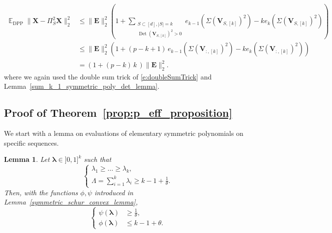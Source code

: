 \documentclass[twoside,11pt]{book}
\newtheorem{lemma}{Lemma}
\numberwithin{theorem}{chapter}
\numberwithin{definition}{chapter}
\numberwithin{proposition}{chapter}
\numberwithin{corollary}{chapter}
\numberwithin{example}{chapter}
\numberwithin{lemma}{chapter}
\numberwithin{assumption}{chapter}
\DeclareMathOperator{\Det}{Det}
\DeclareMathOperator{\DPP}{\mathrm{DPP}}
\DeclareMathOperator{\EX}{\mathbb{E}}
\begin{document}
\begin{align*}
    \EX_{\DPP} \| \bm{X} - \Pi_{S}^{2}\bm{X} \|_{2}^{2} & \leq  \| \bm{E}\|_{2}^{2} \left(1+\sum_{\substack{S \subset [d], |S| = k\\ \Det(\bm{V}_{S,[k]})^{2}>0}} e_{k-1}(\Sigma(\bm{V}_{S,[k]})^{2}) - k e_{k}(\Sigma(\bm{V}_{S,[k]})^{2}) \right)\\
    & \leq \| \bm{E}\|_{2}^{2} \left( 1+ (p-k+1)\,e_{k-1}(\Sigma(\bm{V}_{:,[k]})^{2}) - k e_{k}(\Sigma(\bm{V}_{:,[k]})^{2}) \right)\,\\
    &= (1+(p-k)\,k\,)\| \bm{E}\|_{2}^{2}.
\end{align*}
where we again used the double sum trick of \eqref{e:doubleSumTrick} and Lemma~\ref{sum_k_1_symmetric_poly_det_lemma}.%



\subsection{Proof of Theorem~\ref{prop:p_eff_proposition}}
\label{s:proofOfEffectiveSparsitySetting}
We start with a lemma on evaluations of elementary symmetric polynomials on specific sequences.
\begin{lemma}\label{lemma_k_minus_half}
Let $\bm{\lambda}\in ]0,1]^{k}$ such that
\begin{equation}
	\left\{
	\begin{array}{l}
	    \lambda_{1} \geq \dots \geq \lambda_{k},\\
		\label{eq:lambda_schur_hypo}
   		\Lambda = \sum\limits_{i=1}^{k} \lambda_{i} \geq k-1 + \frac{1}{\theta}.
	\end{array}
	\right.
\end{equation}
Then, with the functions $\phi,\psi$ introduced in Lemma~\ref{symmetric_schur_convex_lemma}, %
\begin{equation}
    \left\{
    \begin{array}{ll}
    	\psi(\bm{\lambda})  & \displaystyle{\geq \frac{1}{\theta},}\\
	\phi(\bm{\lambda})  & \leq k-1 +\theta.
    \end{array}
    \right.
\end{equation}


\end{lemma}
\end{document}
